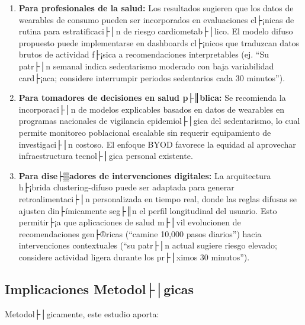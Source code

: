 \begin{enumerate}
    \item \textbf{Para profesionales de la salud:} Los resultados sugieren que los datos de wearables de consumo pueden ser incorporados en evaluaciones cl├¡nicas de rutina para estratificaci├│n de riesgo cardiometab├│lico. El modelo difuso propuesto puede implementarse en dashboards cl├¡nicos que traduzcan datos brutos de actividad f├¡sica a recomendaciones interpretables (ej. ``Su patr├│n semanal indica sedentarismo moderado con baja variabilidad card├¡aca; considere interrumpir periodos sedentarios cada 30 minutos'').
    
    \item \textbf{Para tomadores de decisiones en salud p├║blica:} Se recomienda la incorporaci├│n de modelos explicables basados en datos de wearables en programas nacionales de vigilancia epidemiol├│gica del sedentarismo, lo cual permite monitoreo poblacional escalable sin requerir equipamiento de investigaci├│n costoso. El enfoque BYOD favorece la equidad al aprovechar infraestructura tecnol├│gica personal existente.
    
    \item \textbf{Para dise├▒adores de intervenciones digitales:} La arquitectura h├¡brida clustering-difuso puede ser adaptada para generar retroalimentaci├│n personalizada en tiempo real, donde las reglas difusas se ajusten din├ímicamente seg├║n el perfil longitudinal del usuario. Esto permitir├¡a que aplicaciones de salud m├│vil evolucionen de recomendaciones gen├®ricas (``camine 10,000 pasos diarios'') hacia intervenciones contextuales (``su patr├│n actual sugiere riesgo elevado; considere actividad ligera durante los pr├│ximos 30 minutos'').
\end{enumerate}

\subsection{Implicaciones Metodol├│gicas}
\label{subsec:implicaciones_metodologicas}

Metodol├│gicamente, este estudio aporta:

